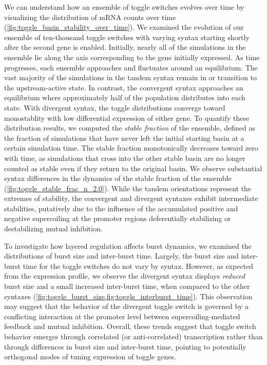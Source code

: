 \documentclass[11pt]{article}
\begin{document}
We can understand how an ensemble of toggle switches evolves over time by visualizing the distribution of mRNA counts over time (\cref{fig:toggle_basin_stability_over_time}).
We examined the evolution of our ensemble of ten-thousand toggle switches with varying syntax starting shortly after the second gene is enabled. Initially, nearly all of the simulations in the ensemble lie along the axis corresponding to the gene initially expressed. As time progresses, each ensemble approaches and fluctuates around an equilibrium. The vast majority of the simulations in the tandem syntax remain in or transition to the upstream-active state. In contrast, the convergent syntax approaches an equilibrium where approximately half of the population distributes into each state. With divergent syntax, the toggle distributions converge toward monostablity with low differential expression of either gene.
To quantify these distribution results, we computed the \emph{stable fraction} of the ensemble, defined as the fraction of simulations that have never left the initial starting basin at a certain simulation time.
The stable fraction monotonically decreases toward zero with time, as simulations that cross into the other stable basin are no longer counted as stable even if they return to the original basin. 
We observe substantial syntax differences in the dynamics of the stable fraction of the ensemble (\cref{fig:toggle_stable_frac_n_2.0}). While the tandem orientations represent the extremes of stability, the convergent and divergent syntaxes exhibit intermediate stabilities, putatively due to the influence of the accumulated positive and negative supercoiling at the promoter regions deferentially stabilizing or destabilizing mutual inhibition.

To investigate how layered regulation affects burst dynamics, we examined the distributions of  burst size and inter-burst time. Largely, the burst size and inter-burst time for the toggle switches do not vary by syntax. However, as expected from the expression profile, we observe the divergent syntax displays \emph{reduced} burst size and a small increased inter-burst time, when compared to the other syntaxes (\cref{fig:toggle_burst_size,fig:toggle_interburst_time}). This observation may suggest that the behavior of the divergent toggle switch is governed by a conflicting interaction at the promoter level between supercoiling-mediated feedback and mutual inhibition. 
Overall, these trends suggest that toggle switch behavior emerges through correlated (or anti-correlated) transcription rather than through differences in burst size and inter-burst time, pointing to potentially orthogonal modes of tuning expression of toggle genes.
\end{document}
